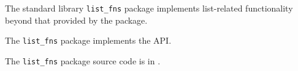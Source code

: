 
The standard library {\tt list\_fns} package implements list-related functionality beyond that provided by the  package.

The {\tt list\_fns} package implements the  API.

The {\tt list\_fns} package source code is in .



